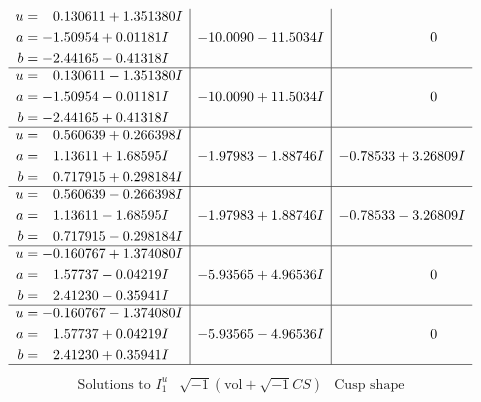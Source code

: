 \documentclass[1p]{elsarticle_modified}
\theoremstyle{definition}
\newcommand{\I}{\sqrt{-1}}
\begin{document}
$$\begin{array}{c|c|c}
\begin{aligned}
u &= \phantom{-}0.130611 + 1.351380 I \\
a &= -1.50954 + 0.01181 I \\
b &= -2.44165 - 0.41318 I\end{aligned}
 & -10.0090 - 11.5034 I & \phantom{-0.000000 } 0 \\ \hline\begin{aligned}
u &= \phantom{-}0.130611 - 1.351380 I \\
a &= -1.50954 - 0.01181 I \\
b &= -2.44165 + 0.41318 I\end{aligned}
 & -10.0090 + 11.5034 I & \phantom{-0.000000 } 0 \\ \hline\begin{aligned}
u &= \phantom{-}0.560639 + 0.266398 I \\
a &= \phantom{-}1.13611 + 1.68595 I \\
b &= \phantom{-}0.717915 + 0.298184 I\end{aligned}
 & -1.97983 - 1.88746 I & -0.78533 + 3.26809 I \\ \hline\begin{aligned}
u &= \phantom{-}0.560639 - 0.266398 I \\
a &= \phantom{-}1.13611 - 1.68595 I \\
b &= \phantom{-}0.717915 - 0.298184 I\end{aligned}
 & -1.97983 + 1.88746 I & -0.78533 - 3.26809 I \\ \hline\begin{aligned}
u &= -0.160767 + 1.374080 I \\
a &= \phantom{-}1.57737 - 0.04219 I \\
b &= \phantom{-}2.41230 - 0.35941 I\end{aligned}
 & -5.93565 + 4.96536 I & \phantom{-0.000000 } 0 \\ \hline\begin{aligned}
u &= -0.160767 - 1.374080 I \\
a &= \phantom{-}1.57737 + 0.04219 I \\
b &= \phantom{-}2.41230 + 0.35941 I\end{aligned}
 & -5.93565 - 4.96536 I & \phantom{-0.000000 } 0\\
 \hline 
 \end{array}$$\newpage$$\begin{array}{c|c|c}  
\text{Solutions to }I^u_{1}& \I (\text{vol} + \sqrt{-1}CS) & \text{Cusp shape}\\
 \hline 
\begin{aligned}

\end{aligned}
\end{array}$$
\end{document}
